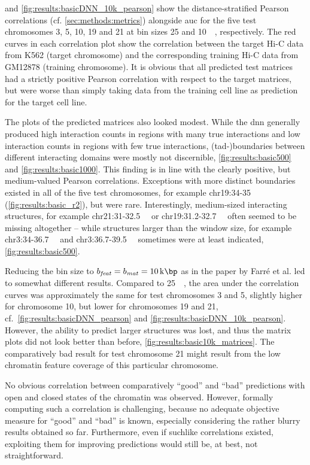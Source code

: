  and \cref{fig:results:basicDNN_10k_pearson} 
show the distance-stratified Pearson correlations (cf. \cref{sec:methods:metrics}) 
alongside \acrfull{auc} for the five test chromosomes 3, 5, 10, 19 and 21 at bin sizes 25 and \SI{10}{\kilo\bp}, respectively.
The red curves in each correlation plot show the correlation between the target Hi-C data from K562 (target chromosome)
and the corresponding training Hi-C data from GM12878 (training chromosome).
It is obvious that all predicted test matrices had a strictly positive Pearson correlation with respect to the target matrices,
but were worse than simply taking data from the training cell line as prediction for the target cell line.

The plots of the predicted matrices also looked modest. 
While the \acrshort{dnn} generally produced high interaction counts in regions with many true interactions
and low interaction counts in regions with few true interactions, (\acrshort{tad}-)boundaries between different interacting domains 
were mostly not discernible, \cref{fig:results:basic500} and \ref{fig:results:basic1000}.
This finding is in line with the clearly positive, but medium-valued Pearson correlations.
Exceptions with more distinct boundaries existed in all of the five test chromosomes,
for example chr19:34-\SI{35}{\mega\bp} (\cref{fig:results:basic_r2}), but were rare. 
Interestingly, medium-sized interacting structures, for example chr21:31-\SI{32.5}{\mega\bp} 
or chr19:31.2-\SI{32.7}{\mega\bp} often seemed to be missing altogether -- 
while structures larger than the window size, for example chr3:34-\SI{36.7}{\mega\bp} and chr3:36.7-\SI{39.5}{\mega\bp}
sometimes were at least indicated, \cref{fig:results:basic500}.

Reducing the bin size to $b_\mathit{feat}=b_\mathit{mat}=\SI{10}{\kilo\bp}$ as in the paper by Farr\'e et al. \cite{Farre2018a} 
led to somewhat different results.
Compared to \SI{25}{\kilo\bp}, the area under the correlation curves was approximately the same for test chromosomes 3 and 5, 
slightly higher for chromosome 10, but lower for chromosomes 19 and 21, cf.~\cref{fig:results:basicDNN_pearson} and \ref{fig:results:basicDNN_10k_pearson}.
However, the ability to predict larger structures was lost, and thus the matrix plots did not look better than before, \cref{fig:results:basic10k_matrices}.
The comparatively bad result for test chromosome 21 might result from the low chromatin feature coverage of this particular chromosome.

No obvious correlation between comparatively ``good'' and ``bad'' predictions with open and closed states of the chromatin was observed.
However, formally computing such a correlation is challenging, because no adequate objective measure for ``good'' and ``bad'' is known, 
especially considering the rather blurry results obtained so far.
Furthermore, even if suchlike correlations existed, exploiting them for improving predictions would still be, at best, not straightforward.

